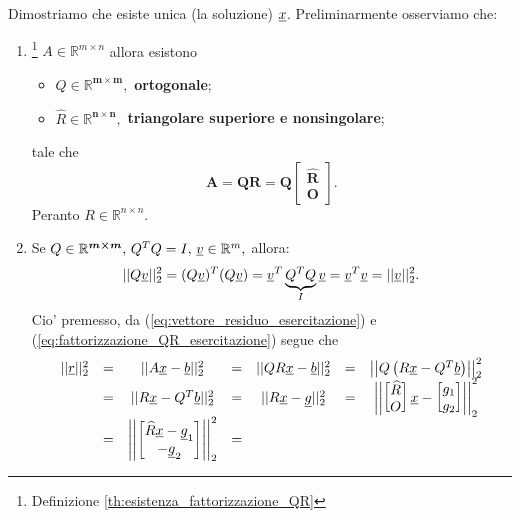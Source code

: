 Dimostriamo che esiste unica (la soluzione) $\uline x$. Preliminarmente osserviamo che:
\begin{enumerate}
	\item \footnote{Definizione \ref{th:esistenza_fattorizzazione_QR}} $A\in\mathbb R^{m\times n}$ allora esistono
	\begin{itemize}
		\item $Q\in\mathbb R^{\boldsymbol{m\times m}},$ \textbf{ortogonale};
		\item $\widehat R\in\mathbb R^{\boldsymbol{n\times n}},$ \textbf{triangolare superiore e nonsingolare};
	\end{itemize}
	tale che
	\begin{equation}\label{eq:fattorizzazione_QR_esercitazione}
		\boldsymbol{A=QR=Q
			\begin{bmatrix}
				\widehat R\\
				O
			\end{bmatrix}.}
	\end{equation}
	Peranto $R\in\mathbb{R}^{n\times n}$.
	\item Se $Q\in\mathbb R^{\boldsymbol{m\times m}},\, Q^TQ=I,\, \uline v\in\mathbb{R}^m,$ allora:
	\begin{equation*}
		||Q\uline v||_2^2=(Q\uline v)^T(Q\uline v)=\uline v^T\underbrace{Q^TQ}_I \uline v = \uline v^T\uline v = ||\uline v||_2^2.
	\end{equation*}
	Cio' premesso, da (\ref{eq:vettore_residuo_esercitazione}) e (\ref{eq:fattorizzazione_QR_esercitazione}) segue che
	\begin{equation*}
		\begin{matrix}
			||\uline r||_2^2 &=& ||A\uline x-\uline b||_2^2 &=&||QR\uline x-\uline b||_2^2 &{=}& \left|\left|Q\left(R\uline x-Q^T\uline b\right)\right|\right|_2^2\\
			&{=}& ||R\uline x-Q^T\uline b||_2^2 &{=}& ||R\uline x - \uline g||_2^2 &=& 
			\left|\left|\begin{bmatrix}
				\widehat R\\
				O
			\end{bmatrix}\uline x - 
			\begin{bmatrix}
				g_1\\
				g_2
			\end{bmatrix}\right|\right|_2^2\\
			&=& \left|\left|\begin{bmatrix}
				\widehat R\uline x-\uline g_1\\
				-\uline g_2
			\end{bmatrix}\right|\right|_2^2 &=&

\end{matrix}
\end{equation*}
\end{enumerate}
